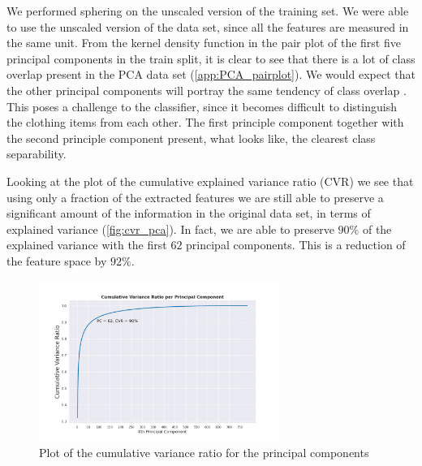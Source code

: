 \documentclass[../main.tex]{subfiles}
\begin{document}
We performed sphering on the unscaled version of the training 
set. We were able to use the unscaled version of the data set, 
since all the features are measured in the same unit. 
From the kernel density function in the pair plot of the first 
five principal components in the train split, it is clear to see 
that there is a lot of class overlap present in the PCA data set 
(\autoref{app:PCA_pairplot}). We would expect that the other 
principal components will portray the same tendency of class 
overlap \autocite{JamesStatisticalLearning}.
This poses a challenge to the classifier, since it becomes 
difficult to distinguish the clothing items from each other.
The first principle component together with the second principle 
component present, what looks like, the clearest class 
separability. 

Looking at the plot of the cumulative explained variance ratio 
(CVR) we see that using only a fraction of the extracted features 
we are still able to preserve a significant amount of the 
information in the original data set, in terms of explained 
variance (\autoref{fig:cvr_pca}). In fact, we are able to 
preserve $90\%$ of the explained variance with the first $62$ 
principal components. This is a reduction of the feature space by 
$92\%$.

\begin{figure}[ht]
    \centering
    \includegraphics[width=0.7\textwidth]
    {images/CumVarianceRatio_PCA.png}
    \vspace*{-5mm} %
    \caption{Plot of the cumulative variance ratio for the 
    principal components}
    \label{fig:cvr_pca}
\end{figure}
\end{document}
